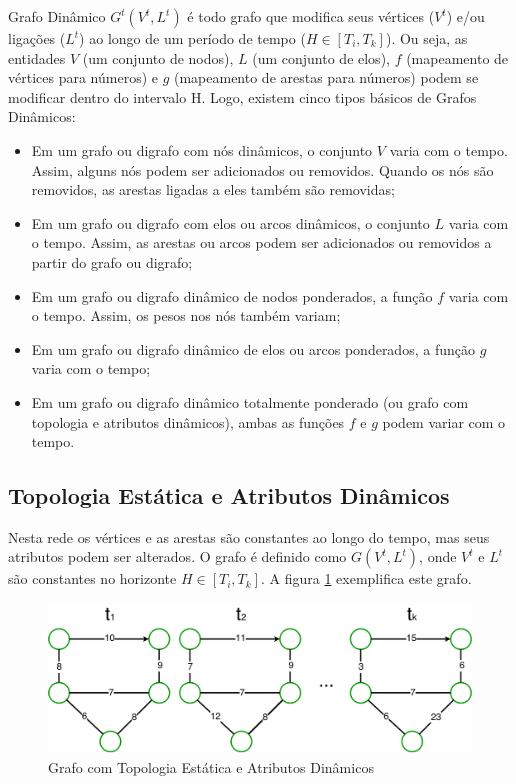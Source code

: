 Grafo Dinâmico $G^t(V^t, L^t)$ é todo grafo que modifica seus vértices ($V^t$) e/ou ligações ($L^t$)
ao longo de um período de tempo ($H \in [T_i, T_k]$). Ou seja, as entidades $V$ (um conjunto de nodos),
$L$ (um conjunto de elos), $f$ (mapeamento de vértices para números) e $g$ (mapeamento de arestas para números)
podem se modificar dentro do intervalo H.
Logo, existem cinco tipos básicos de Grafos Dinâmicos:

\begin{itemize}
\item Em um grafo ou digrafo com nós dinâmicos, o conjunto $V$ varia com o tempo. Assim, alguns nós podem
ser adicionados ou removidos. Quando os nós são removidos, as arestas ligadas a eles também são removidas; 
\item Em um grafo ou digrafo com elos ou arcos dinâmicos, o conjunto $L$ varia com o tempo. Assim, as arestas ou arcos podem
ser adicionados ou removidos a partir do grafo ou digrafo;
\item Em um grafo ou digrafo dinâmico de nodos ponderados, a função $f$ varia com o tempo. Assim, os pesos nos nós também variam;
\item Em um grafo ou digrafo dinâmico de elos ou arcos ponderados, a função $g$ varia com o tempo;
\item Em um grafo ou digrafo dinâmico totalmente ponderado (ou grafo com topologia e atributos dinâmicos), ambas as funções $f$ e $g$
podem variar com o tempo.
\end{itemize}

\subsection{Topologia Estática e Atributos Dinâmicos}
Nesta rede os vértices e as arestas são constantes ao longo do tempo, mas seus atributos podem ser alterados.
O grafo é definido como $G(V^t, L^t)$, onde $V^t$ e $L^t$ são constantes no horizonte $H \in [T_i, T_k]$.
A figura \ref{fig:tead} exemplifica este grafo.

\begin{figure}[htbp]
\centering
 \includegraphics[width=.80\textwidth]{chapters/fig/tead.png}
\caption{Grafo com Topologia Estática e Atributos Dinâmicos}
\label{fig:tead}
\end{figure}

